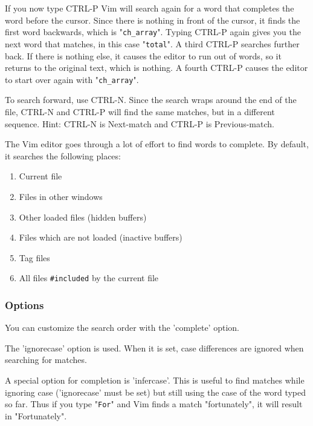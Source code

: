 If you now type CTRL-P Vim will search again for a word that completes the word before the cursor.
Since there is nothing in front of the cursor, it finds the first word backwards, which is "\verb!ch_array!".
Typing CTRL-P again gives you the next word that matches, in this case "\verb!total!".
A third CTRL-P searches further back.
If there is nothing else, it causes the editor to run out of words, so it returns to the original text, which is nothing.
A fourth CTRL-P causes the editor to start over again with "\verb!ch_array!".

To search forward, use CTRL-N.
Since the search wraps around the end of the file, CTRL-N and CTRL-P will find the same matches, but in a different sequence.
Hint: CTRL-N is Next-match and CTRL-P is Previous-match.

The Vim editor goes through a lot of effort to find words to complete.
By default, it searches the following places:
\begin{enumerate}
				\item Current file
				\item Files in other windows
				\item Other loaded files (hidden buffers)
				\item Files which are not loaded (inactive buffers)
				\item Tag files
				\item All files \verb!#included! by the current file
\end{enumerate}
\subsubsection{Options}
You can customize the search order with the 'complete' option.

The 'ignorecase' option is used.
When it is set, case differences are ignored when searching for matches.

A special option for completion is 'infercase'.
This is useful to find matches while ignoring case ('ignorecase' must be set) but still using the case of the word typed so far.
Thus if you type "\verb!For!" and Vim finds a match "fortunately", it will result in "Fortunately".

